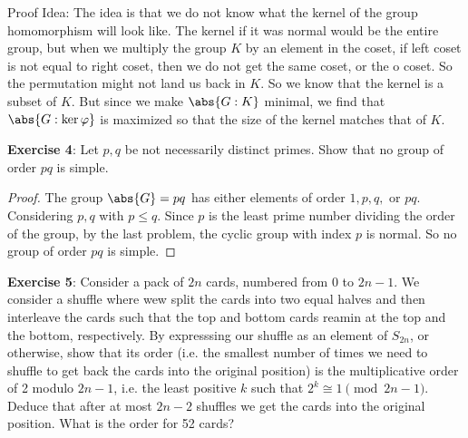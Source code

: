 \documentclass{article}
\begin{document}
Proof Idea: The idea is that we do not know what the kernel of the group homomorphism will look like. The kernel if it was normal would be the entire group, but when we multiply the group $K$ by an element in the coset, if left coset is not equal to right coset, then we do not get the same coset, or the o coset. So the permutation might not land us back in $K$. So we know that the kernel is a subset of $K$. But since we make $\abs{G : K}$ minimal, we find that $\abs{G : \ker{\varphi}}$ is maximized so that the size of the kernel matches that of $K$. 

\textbf{Exercise 4}: Let $p, q$ be not necessarily distinct primes. Show that no group of order $pq$ is simple.
\begin{proof}
	The group $\abs{G} = pq$ has either elements of order $1, p, q,$ or $pq$. Considering $p, q$ with $p \leq q$. Since $p$ is the least prime number dividing the order of the group, by the last problem, the cyclic group with index $p$ is normal. So no group of order $pq$ is simple.
\end{proof}

\textbf{Exercise 5}: Consider a pack of $2n$ cards, numbered from $0$ to $2n - 1$. We consider a shuffle where wew split the cards into two equal halves and then interleave the cards such that the top and bottom cards reamin at the top and the bottom, respectively. By expresssing our shuffle as an element of $S_{2n}$, or otherwise, show that its order (i.e. the smallest number of times we need to shuffle to get back the cards into the original position) is the multiplicative order of 2 modulo $2n - 1$, i.e. the least positive $k$ such that $2^{k} \cong 1 \pmod{2n - 1}$. Deduce that after at most $2n - 2$ shuffles we get the cards into the original position. What is the order for 52 cards?
\end{document}
